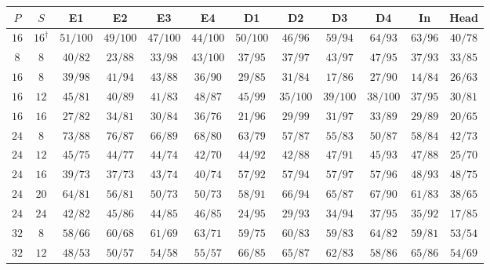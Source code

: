 \begin{table}[!tbp]
    \centering
    \color{red}\captionsetup{font+=probingred} %
    \small
    \setlength{\tabcolsep}{3.5pt}
    \begin{tabular}{@{}cccccccccccc@{}}
        \toprule
        \textbf{$P$} & \textbf{$S$} & \textbf{E1} & \textbf{E2} & \textbf{E3} & \textbf{E4} & \textbf{D1} & \textbf{D2} & \textbf{D3} & \textbf{D4} & \textbf{In} & \textbf{Head} \\
        \midrule
        $16$ & $16^{\dagger}$ & $51/100$ & $49/100$ & $47/100$ & $44/100$ & $50/100$ & $46/96$ & $59/94$ & $64/93$ & $63/96$ & $40/78$ \\
        \midrule
        \addlinespace[2pt]
        $8$ & $8$ & $40/82$ & $23/88$ & $33/98$ & $43/100$ & $37/95$ & $37/97$ & $43/97$ & $47/95$ & $37/93$ & $33/85$ \\
        \addlinespace[2pt]
        $16$ & $8$ & $39/98$ & $41/94$ & $43/88$ & $36/90$ & $29/85$ & $31/84$ & $17/86$ & $27/90$ & $14/84$ & $26/63$ \\
        $16$ & $12$ & $45/81$ & $40/89$ & $41/83$ & $48/87$ & $45/99$ & $35/100$ & $39/100$ & $38/100$ & $37/95$ & $30/81$ \\
        $16$ & $16$ & $27/82$ & $34/81$ & $30/84$ & $36/76$ & $21/96$ & $29/99$ & $31/97$ & $33/89$ & $29/89$ & $20/65$ \\
        \addlinespace[2pt]
        $24$ & $8$ & $73/88$ & $76/87$ & $66/89$ & $68/80$ & $63/79$ & $57/87$ & $55/83$ & $50/87$ & $58/84$ & $42/73$ \\
        $24$ & $12$ & $45/75$ & $44/77$ & $44/74$ & $42/70$ & $44/92$ & $42/88$ & $47/91$ & $45/93$ & $47/88$ & $25/70$ \\
        $24$ & $16$ & $39/73$ & $37/73$ & $43/74$ & $40/74$ & $57/92$ & $57/94$ & $57/97$ & $57/96$ & $48/93$ & $48/75$ \\
        $24$ & $20$ & $64/81$ & $56/81$ & $50/73$ & $50/73$ & $58/91$ & $66/94$ & $65/87$ & $67/90$ & $61/83$ & $38/65$ \\
        $24$ & $24$ & $42/82$ & $45/86$ & $44/85$ & $46/85$ & $24/95$ & $29/93$ & $34/94$ & $37/95$ & $35/92$ & $17/85$ \\
        \addlinespace[2pt]
        $32$ & $8$ & $58/66$ & $60/68$ & $61/69$ & $63/71$ & $59/75$ & $60/83$ & $59/83$ & $64/82$ & $59/81$ & $53/54$ \\
        $32$ & $12$ & $48/53$ & $50/57$ & $54/58$ & $55/57$ & $66/85$ & $65/87$ & $62/83$ & $58/86$ & $65/86$ & $54/69$ \\

\end{tabular}
\end{table}
